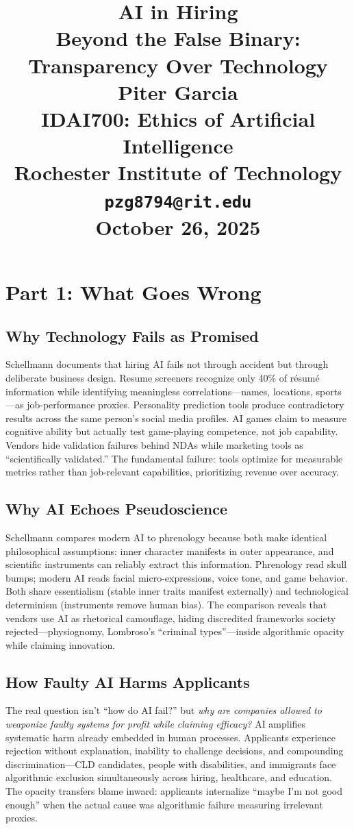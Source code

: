 \documentclass[11pt,twoside]{article}
\title{
\vspace*{2in}
\textbf{\Huge AI in Hiring}\\[1em]
\LARGE Beyond the False Binary: Transparency Over Technology\\[2em]

\vfill
\Huge \textbf{Piter Garcia}\\
\LARGE IDAI700: Ethics of Artificial Intelligence\\
Rochester Institute of Technology\\
\texttt{pzg8794@rit.edu}\\

\vfill
\Huge \textbf{October 26, 2025}
}
\author{}
\date{}
\begin{document}
\thispagestyle{empty}
\maketitle
\newpage

\pagestyle{fancy}
\newpage

\section{Part 1: What Goes Wrong}

\subsection{Why Technology Fails as Promised}
Schellmann documents that hiring AI fails not through accident but through deliberate business design. Resume screeners recognize only 40\% of résumé information while identifying meaningless correlations—names, locations, sports—as job-performance proxies. Personality prediction tools produce contradictory results across the same person's social media profiles. AI games claim to measure cognitive ability but actually test game-playing competence, not job capability. Vendors hide validation failures behind NDAs while marketing tools as \enquote{scientifically validated.} The fundamental failure: tools optimize for measurable metrics rather than job-relevant capabilities, prioritizing revenue over accuracy.

\subsection{Why AI Echoes Pseudoscience}
Schellmann compares modern AI to phrenology because both make identical philosophical assumptions: inner character manifests in outer appearance, and scientific instruments can reliably extract this information. Phrenology read skull bumps; modern AI reads facial micro-expressions, voice tone, and game behavior. Both share essentialism (stable inner traits manifest externally) and technological determinism (instruments remove human bias). The comparison reveals that vendors use AI as rhetorical camouflage, hiding discredited frameworks society rejected—physiognomy, Lombroso's \enquote{criminal types}—inside algorithmic opacity while claiming innovation.

\subsection{How Faulty AI Harms Applicants}
The real question isn't \enquote{how do AI fail?} but \textit{why are companies allowed to weaponize faulty systems for profit while claiming efficacy?} AI amplifies systematic harm already embedded in human processes. Applicants experience rejection without explanation, inability to challenge decisions, and compounding discrimination—CLD candidates, people with disabilities, and immigrants face algorithmic exclusion simultaneously across hiring, healthcare, and education. The opacity transfers blame inward: applicants internalize \enquote{maybe I'm not good enough} when the actual cause was algorithmic failure measuring irrelevant proxies.
\end{document}
